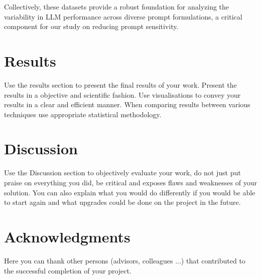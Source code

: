 \documentclass[fleqn,moreauthors,10pt]{ds_report}
\begin{document}
Collectively, these datasets provide a robust foundation for analyzing the variability in LLM performance across diverse prompt formulations, a critical component for our study on reducing prompt sensitivity.




\section*{Results}

Use the results section to present the final results of your work. Present the results in a objective and scientific fashion. Use visualisations to convey your results in a clear and efficient manner. When comparing results between various techniques use appropriate statistical methodology.




\section*{Discussion}

Use the Discussion section to objectively evaluate your work, do not just put praise on everything you did, be critical and exposes flaws and weaknesses of your solution. You can also explain what you would do differently if you would be able to start again and what upgrades could be done on the project in the future.



\section*{Acknowledgments}

Here you can thank other persons (advisors, colleagues ...) that contributed to the successful completion of your project.




\end{document}
